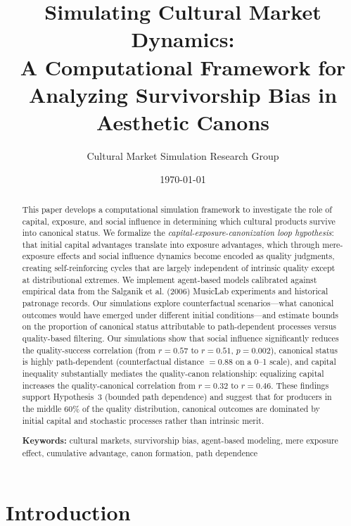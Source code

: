 \documentclass[11pt,a4paper]{article}
\title{\textbf{Simulating Cultural Market Dynamics:} \\ 
\large A Computational Framework for Analyzing Survivorship Bias in Aesthetic Canons}
\author{Cultural Market Simulation Research Group}
\date{\today}
\begin{document}
\maketitle

\begin{abstract}
This paper develops a computational simulation framework to investigate the role of capital, exposure, and social influence in determining which cultural products survive into canonical status. We formalize the \textit{capital-exposure-canonization loop hypothesis}: that initial capital advantages translate into exposure advantages, which through mere-exposure effects and social influence dynamics become encoded as quality judgments, creating self-reinforcing cycles that are largely independent of intrinsic quality except at distributional extremes. We implement agent-based models calibrated against empirical data from the Salganik et al. (2006) MusicLab experiments and historical patronage records. Our simulations explore counterfactual scenarios---what canonical outcomes would have emerged under different initial conditions---and estimate bounds on the proportion of canonical status attributable to path-dependent processes versus quality-based filtering. Our simulations show that social influence significantly reduces the quality-success correlation (from $r = 0.57$ to $r = 0.51$, $p = 0.002$), canonical status is highly path-dependent (counterfactual distance $= 0.88$ on a 0--1 scale), and capital inequality substantially mediates the quality-canon relationship: equalizing capital increases the quality-canonical correlation from $r = 0.32$ to $r = 0.46$. These findings support Hypothesis~3 (bounded path dependence) and suggest that for producers in the middle 60\% of the quality distribution, canonical outcomes are dominated by initial capital and stochastic processes rather than intrinsic merit.

\vspace{0.5em}
\noindent\textbf{Keywords:} cultural markets, survivorship bias, agent-based modeling, mere exposure effect, cumulative advantage, canon formation, path dependence
\end{abstract}

\newpage
\tableofcontents
\newpage

\section{Introduction}
\end{document}
